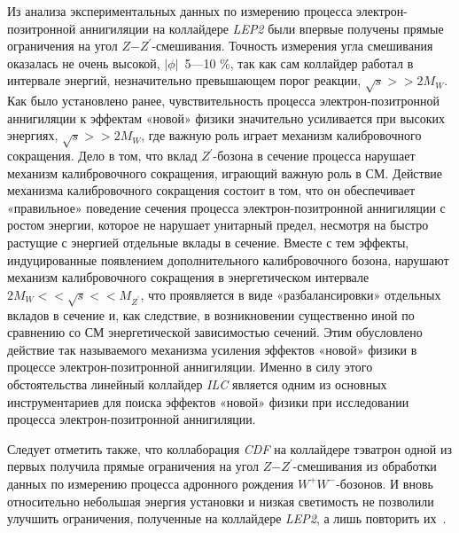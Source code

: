 Из анализа экспериментальных данных по измерению процесса электрон-позитронной аннигиляции на коллайдере \textit{LEP2} были впервые получены прямые ограничения на угол $Z$−$Z^\prime$-смешивания. Точность измерения угла смешивания оказалась не очень высокой, $\left |\phi \right |$~5—10 \%, так как сам коллайдер работал в интервале энергий, незначительно превышающем порог реакции, $\sqrt{s} >> 2M_W$. Как было установлено ранее, чувствительность процесса электрон-позитронной аннигиляции к эффектам «новой» физики значительно усиливается при высоких энергиях, $\sqrt{s} >> 2M_W$, где важную роль играет механизм калибровочного сокращения. Дело в том, что вклад $Z^\prime$-бозона в сечение процесса нарушает механизм калибровочного сокращения, играющий важную роль в СМ. Действие механизма калибровочного сокращения состоит в том, что он обеспечивает «правильное» поведение сечения процесса электрон-позитронной аннигиляции с ростом энергии, которое не нарушает унитарный предел, несмотря на быстро растущие с энергией отдельные вклады в сечение. Вместе с тем эффекты, индуцированные появлением дополнительного калибровочного бозона, нарушают механизм калибровочного сокращения в энергетическом интервале $2M_W << \sqrt{s} << M_{Z^\prime}$, что проявляется в виде «разбалансировки» отдельных вкладов в сечение и, как следствие, в возникновении существенно иной по сравнению со СМ энергетической зависимостью сечений. Этим обусловлено действие так называемого механизма усиления эффектов «новой» физики в процессе электрон-позитронной аннигиляции. Именно в силу этого обстоятельства линейный коллайдер \textit{ILC} является одним из основных инструментариев для поиска эффектов «новой» физики при исследовании процесса электрон-позитронной аннигиляции.

Следует отметить также, что коллаборация \textit{CDF} на коллайдере тэватрон одной из первых получила прямые ограничения на угол $Z$−$Z^\prime$-смешивания из обработки данных по измерению процесса адронного рождения $W^+W^−$-бозонов. И вновь относительно небольшая энергия установки и низкая светимость не позволили улучшить ограничения, полученные на коллайдере \textit{LEP2}, а лишь повторить их~\cite{ada-wwz:2013}.

